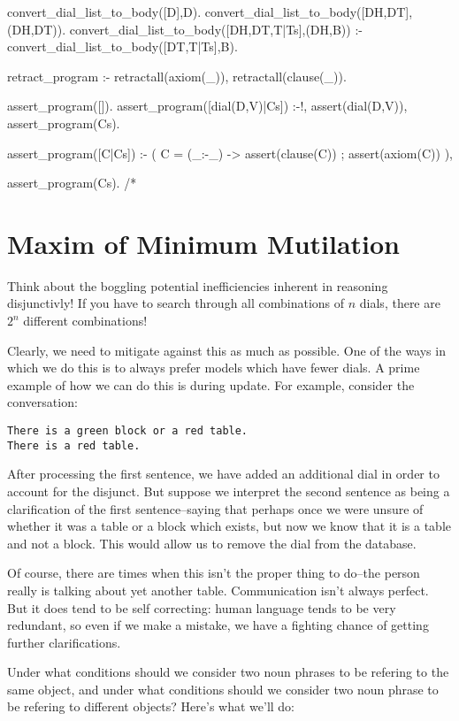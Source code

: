\documentclass{book}[9pt]
\newenvironment{code}%
{\small \verbatim}%
{\endverbatim \large}
\begin{document}
\begin{code}
convert_dial_list_to_body([D],D).
convert_dial_list_to_body([DH,DT],(DH,DT)).
convert_dial_list_to_body([DH,DT,T|Ts],(DH,B)) :-
        convert_dial_list_to_body([DT,T|Ts],B).
        

retract_program :-
     retractall(axiom(_)),
     retractall(clause(_)).

assert_program([]).
assert_program([dial(D,V)|Cs]) :-!,
        assert(dial(D,V)),
        assert_program(Cs).

assert_program([C|Cs]) :-
       ( C = (_:-_) 
       ->  assert(clause(C))
       ;   assert(axiom(C))
       ),
       
       assert_program(Cs).
/*
\end{code}

\section{Maxim of Minimum Mutilation}

Think about the boggling potential inefficiencies inherent in
reasoning disjunctivly!  If you have to search through all
combinations of $n$ dials, there are $2^n$ different combinations!

Clearly, we need to mitigate against this as much as possible.  One of
the ways in which we do this is to always prefer models which have
fewer dials.  A prime example of how we can do this is during update. 
For example, consider the conversation:
\begin{verbatim}
There is a green block or a red table.
There is a red table.
\end{verbatim}
\noindent After processing the first sentence, we have added an
additional dial in order to account for the disjunct.  But suppose we
interpret the second sentence as being a clarification of the first
sentence--saying that perhaps once we were unsure of whether it was a
table or a block which exists, but now we know that it is a table and
not a block.  This would allow us to remove the dial from the database.

Of course, there are times when this isn't the proper thing to do--the
person really is talking about yet another table.  Communication isn't
always perfect.  But it does tend to be self correcting: human
language tends to be very redundant, so even if we make a mistake, we
have a fighting chance of getting further clarifications.

Under what conditions should we consider two noun phrases to be
refering to the same object, and under what conditions should we
consider two noun phrase to be refering to different objects?  Here's
what we'll do:
\end{document}
